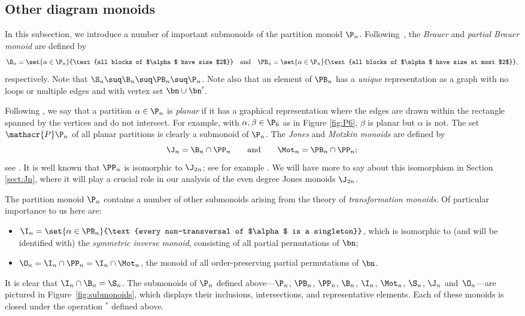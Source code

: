 \subsection{Other diagram monoids}\label{sec:prelim_other}


In this subsection, we introduce a number of important submonoids of the partition monoid $\P_n$.
Following~\cite{Maz1998},
the \emph{Brauer} and \emph{partial Brauer monoid} are defined by
\[
\B_n = \set{\alpha\in\P_n}{\text{all blocks of $\alpha$ have size $2$}} \quad\text{and}\quad
\PB_n = \set{\alpha\in\P_n}{\text{all blocks of $\alpha$ have size at most $2$}},
\]
respectively.  Note that $\S_n\suq\B_n\suq\PB_n\suq\P_n$.  Note also that an
element of $\PB_n$ has a \emph{unique} representation as a 
graph with no loops or multiple edges and with vertex set $\bn\cup\bn'$.

Following \cite{Jones1994_2}, we say that a partition $\alpha\in\P_n$ is
\emph{planar} if it has a graphical representation where 
the edges are drawn within the rectangle spanned by the vertices and do not intersect.
For example, with $\alpha,\beta\in\P_6$ as in
Figure \ref{fig:P6}, $\beta$ is planar but $\alpha$ is not.  The set
$\mathscr{P}\P_n$ of all planar partitions is clearly a submonoid of $\P_n$.
The \emph{Jones} and \emph{Motzkin monoids} are defined by
\[
\J_n = \B_n \cap \PP_n \qquad\text{and}\qquad \Mot_n=\PB_n\cap\PP_n;
\]
see \cite{HLP2013,LF2006}.  It is well known \cite{HR2005,Jones1994_2} that $\PP_n$ is isomorphic to $\J_{2n}$; see for example \cite[p873]{HR2005}.  We will have more to say about this isomorphism in Section \ref{sect:Jn}, where it will play a crucial role in our analysis of the even degree Jones monoids $\J_{2n}$.  

The partition monoid $\P_n$ contains a number of other submonoids arising from the theory of \emph{transformation monoids}.  
Of particular importance to us here are:
\begin{itemize}
\item
$\I_n = \set{\alpha\in\PB_n}{\text{every non-transversal of $\alpha$ is a singleton}}$,
which is isomorphic to (and will be identified with) the \emph{symmetric inverse monoid},
consisting of all partial permutations of $\bn$;
\item
$\O_n=\I_n\cap\PP_n=\I_n\cap\Mot_n$, the monoid of all order-preserving partial permutations of $\bn$.
\end{itemize}
It is clear that $\I_n\cap\B_n=\S_n$.
%
The submonoids of $\P_n$ defined above---$\P_n$, $\PB_n$, $\PP_n$, $\B_n$,
$\I_n$, $\Mot_n$, $\S_n$, $\J_n$ and~$\O_n$---are pictured in
Figure~\ref{fig:submonoids}, which displays their inclusions, intersections,
and representative elements.  Each of these monoids is closed under the
operation ${}^*$ defined above.

